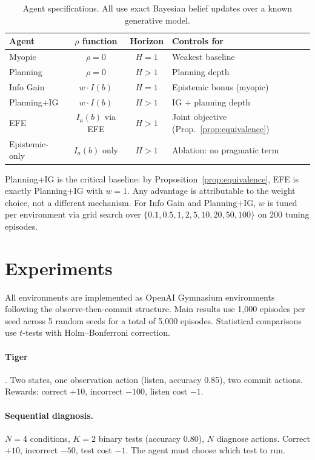 \documentclass[runningheads]{llncs}
\begin{document}
\begin{table}[ht]
\centering
\caption{Agent specifications. All use exact Bayesian belief updates over a known generative model.}
\label{tab:agents}
\begin{small}
\begin{tabular}{lccl}
\toprule
Agent & $\rho$ function & Horizon & Controls for \\
\midrule
Myopic & $\rho = 0$ & $H{=}1$ & Weakest baseline \\
Planning & $\rho = 0$ & $H > 1$ & Planning depth \\
Info Gain & $w \cdot I(b)$ & $H{=}1$ & Epistemic bonus (myopic) \\
Planning+IG & $w \cdot I(b)$ & $H > 1$ & IG + planning depth \\
EFE & $I_a(b)$ via EFE & $H > 1$ & Joint objective (Prop.~\ref{prop:equivalence}) \\
Epistemic-only & $I_a(b)$ only & $H > 1$ & Ablation: no pragmatic term \\
\bottomrule
\end{tabular}
\end{small}
\end{table}

Planning+IG is the critical baseline: by Proposition~\ref{prop:equivalence}, EFE is exactly Planning+IG with $w{=}1$. Any advantage is attributable to the weight choice, not a different mechanism. For Info Gain and Planning+IG, $w$ is tuned per environment via grid search over $\{0.1, 0.5, 1, 2, 5, 10, 20, 50, 100\}$ on 200 tuning episodes.

\section{Experiments}

All environments are implemented as OpenAI Gymnasium environments following the observe-then-commit structure. Main results use 1{,}000 episodes per seed across 5 random seeds for a total of 5{,}000 episodes. Statistical comparisons use $t$-tests with Holm--Bonferroni correction.

\paragraph{Tiger} \citep{kaelbling1998}. Two states, one observation action (listen, accuracy 0.85), two commit actions. Rewards: correct $+10$, incorrect $-100$, listen cost $-1$.

\paragraph{Sequential diagnosis.} $N{=}4$ conditions, $K{=}2$ binary tests (accuracy 0.80), $N$ diagnose actions. Correct $+10$, incorrect $-50$, test cost $-1$. The agent must choose which test to run.
\end{document}
